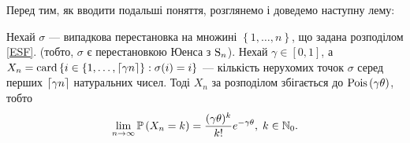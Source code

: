 Перед тим, як вводити подальші поняття, розглянемо і доведемо наступну лему:
\begin{lemma}\label{main_lemma}
    Нехай $\sigma$ --- випадкова перестановка на множині
    $\left\{1, \dots, n\right\}$, що задана розподілом \eqref{ESF}.
    (тобто, $\sigma$ є перестановкою Юенса з $\Sym{n}$).
    Нехай $\gamma \in [0, 1]$, а
    $X_n = \card\left\{i\in \left\{1,\dots,\ceil*{\gamma n} \right\} : \sigma(i) = i\right\}$
    --- кількість нерухомих точок
    $\sigma$ серед перших $\ceil*{\g n}$ натуральних чисел.
    Тоді $X_n$ за розподілом збігається до $\Poiss{\gamma\theta}$, тобто
    \begin{gather}
        \lim_{n\to\infty} \P{X_n = k} = \frac{(\gamma\theta)^k}{k!}e^{-\gamma\theta}, \; k \in \N_0.
    \end{gather} 
\end{lemma}
